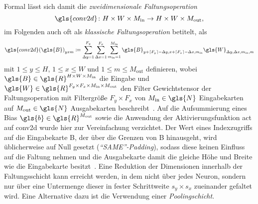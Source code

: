 Formal lässt sich damit die \emph{zweidimensionale Faltungsoperation}
\begin{equation*}
  \gls{conv2d} \colon H \times W \times M_{\mathrm{in}} \to H \times W \times M_{\mathrm{out}},
\end{equation*}
im Folgenden auch oft als \emph{klassische Faltungsoperation} betitelt, als
\begin{equation*}
  {\gls{conv2d}\left(\gls{B}\right)}_{yxm} \coloneqq \sum_{\Delta y = 1}^{F_y} \sum_{\Delta x = 1}^{F_x} \sum_{m_{\mathrm{in}} = 1}^{M_\mathrm{in}} \gls{B}_{y + \left\lceil F_y \right\rceil - \Delta y, x + \left\lceil F_x \right\rceil - \Delta x, m_{\mathrm{in}}} \gls{W}_{\Delta y, \Delta x, m_{\mathrm{in}}, m}
\end{equation*}
mit $1 \leq y \leq H$, $1 \leq x \leq W$ und $1 \leq m \leq M_{\mathrm{out}}$ definieren, wobei $\gls{B} \in \gls{R}^{H \times W \times M_{\mathrm{in}}}$ die Eingabe und $\gls{W} \in \gls{R}^{F_y \times F_x \times M_{\mathrm{in}} \times M_{\mathrm{out}}}$ den Filter \bzw{} Gewichtstensor der Faltungsoperation mit Filtergröße $F_y \times F_x$ von $M_{\mathrm{in}} \in \gls{N}$ Eingabekarten auf $M_{\mathrm{out}} \in \gls{N}$ Ausgabekarten beschreibt~\cite{tensorflow}.
Auf die Aufsummierung eines Bias $\gls{b} \in \gls{R}^{M_{\mathrm{out}}}$ sowie die Anwendung der Aktivierungsfunktion \gls{act} auf \gls{conv2d} wurde hier zur Vereinfachung verzichtet.
Der Wert eines Indexzugriffs auf die Eingabekarte \gls{B}, der über die Grenzen von \gls{B} hinausgeht, wird üblicherweise auf Null gesetzt (\emph{\enquote{SAME}-Padding}), sodass diese keinen Einfluss auf die Faltung nehmen und die Ausgabekarte damit die gleiche Höhe und Breite wie die Eingabekarte besitzt~\cite{tensorflow}.
Eine Reduktion der Dimensionen innerhalb der Faltungsschicht kann erreicht werden, in dem nicht über jedes Neuron, sondern nur über eine Untermenge dieser in fester Schrittweite $s_y \times s_x$ zueinander gefaltet wird.
Eine Alternative dazu ist die Verwendung einer \emph{Poo\-ling\-sch\-icht}.

